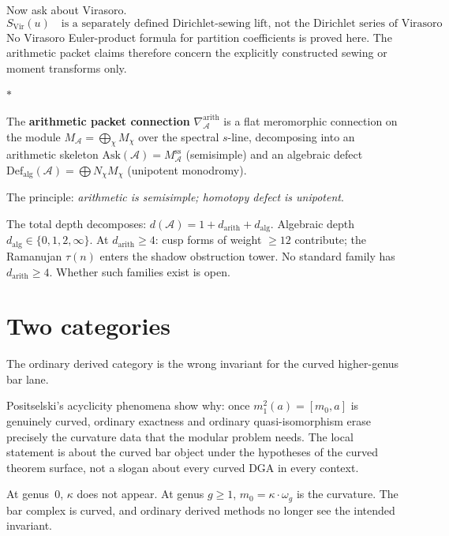 \documentclass[11pt]{article}
\newcommand{\cA}{\mathcal{A}}
\newcommand{\sep}{\bigskip\begin{center}$*$\end{center}\medskip}
\begin{document}
Now ask about Virasoro.
\begin{equation}\label{eq:virasoro-dirichlet-wn}
S_{\mathrm{Vir}}(u)
\quad\text{is a separately defined Dirichlet-sewing lift, not
the Dirichlet series of Virasoro partition coefficients.}
\end{equation}
No Virasoro Euler-product formula for partition coefficients is
proved here.  The arithmetic packet claims therefore concern
the explicitly constructed sewing or moment transforms only.

\sep

The \textbf{arithmetic packet connection}
$\nabla^{\mathrm{arith}}_\cA$ is a flat meromorphic connection
on the module $M_\cA = \bigoplus_\chi M_\chi$ over the
spectral $s$-line, decomposing into an arithmetic skeleton
$\mathrm{Ask}(\cA) = M_\cA^{\mathrm{ss}}$ (semisimple) and
an algebraic defect
$\mathrm{Def}_{\mathrm{alg}}(\cA) = \bigoplus N_\chi M_\chi$
(unipotent monodromy).

The principle: \textit{arithmetic is semisimple; homotopy
defect is unipotent}.

The total depth decomposes:
$d(\cA) = 1 + d_{\mathrm{arith}} + d_{\mathrm{alg}}$.
Algebraic depth $d_{\mathrm{alg}} \in \{0, 1, 2, \infty\}$.
At $d_{\mathrm{arith}} \geq 4$: cusp forms of weight
$\geq 12$ contribute; the Ramanujan $\tau(n)$ enters the
shadow obstruction tower.  No standard family has
$d_{\mathrm{arith}} \geq 4$.  Whether such families exist is
open.


\section{Two categories}
\label{sec:two-categories}

The ordinary derived category is the wrong invariant for the
curved higher-genus bar lane.

Positselski's acyclicity phenomena show why: once
$m_1^2(a)=[m_0,a]$ is genuinely curved, ordinary exactness and
ordinary quasi-isomorphism erase precisely the curvature data
that the modular problem needs.  The local statement is about the
curved bar object under the hypotheses of the curved theorem
surface, not a slogan about every curved DGA in every context.

At genus~$0$, $\kappa$ does not appear.  At genus $g \geq 1$,
$m_0 = \kappa \cdot \omega_g$ is the curvature.  The bar
complex is curved, and ordinary derived methods no longer see
the intended invariant.
\end{document}
